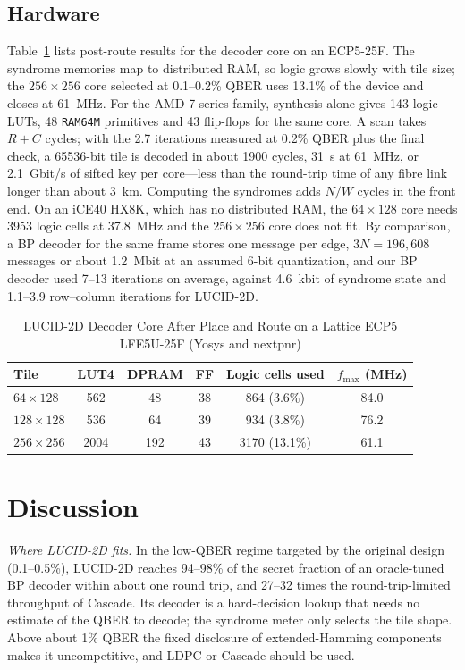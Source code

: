 \documentclass[conference]{IEEEtran}
\begin{document}
\subsection{Hardware}
Table~\ref{tab:hw} lists post-route results for the decoder core on an ECP5-25F. The syndrome memories map to distributed RAM, so logic grows slowly with tile size; the $256\times256$ core selected at 0.1--0.2\% QBER uses 13.1\% of the device and closes at 61~MHz. For the AMD 7-series family, synthesis alone gives 143 logic LUTs, 48 \texttt{RAM64M} primitives and 43 flip-flops for the same core. A scan takes $R+C$ cycles; with the 2.7 iterations measured at 0.2\% QBER plus the final check, a 65536-bit tile is decoded in about 1900 cycles, 31~\textmu s at 61~MHz, or 2.1~Gbit/s of sifted key per core---less than the round-trip time of any fibre link longer than about 3~km. Computing the syndromes adds $N/W$ cycles in the front end. On an iCE40 HX8K, which has no distributed RAM, the $64\times128$ core needs 3953 logic cells at 37.8~MHz and the $256\times256$ core does not fit. By comparison, a BP decoder for the same frame stores one message per edge, $3N=196{,}608$ messages or about 1.2~Mbit at an assumed 6-bit quantization, and our BP decoder used 7--13 iterations on average, against 4.6~kbit of syndrome state and 1.1--3.9 row--column iterations for LUCID-2D.

\begin{table}[t]
\caption{LUCID-2D Decoder Core After Place and Route on a Lattice ECP5 LFE5U-25F (Yosys and nextpnr)}
\label{tab:hw}
\centering
\setlength{\tabcolsep}{4pt}
\begin{tabular}{@{}lccccc@{}}
\toprule
Tile & LUT4 & DPRAM & FF & Logic cells used & $f_{\max}$ (MHz)\\
\midrule
$64\times128$ & 562 & 48 & 38 & 864 (3.6\%) & 84.0\\
$128\times128$ & 536 & 64 & 39 & 934 (3.8\%) & 76.2\\
$256\times256$ & 2004 & 192 & 43 & 3170 (13.1\%) & 61.1\\
\bottomrule
\end{tabular}
\end{table}

\section{Discussion}\label{sec:discussion}
\textit{Where LUCID-2D fits.} In the low-QBER regime targeted by the original design (0.1--0.5\%), LUCID-2D reaches 94--98\% of the secret fraction of an oracle-tuned BP decoder within about one round trip, and 27--32 times the round-trip-limited throughput of Cascade. Its decoder is a hard-decision lookup that needs no estimate of the QBER to decode; the syndrome meter only selects the tile shape. Above about 1\% QBER the fixed disclosure of extended-Hamming components makes it uncompetitive, and LDPC or Cascade should be used.
\end{document}

